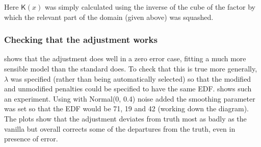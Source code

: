 Here $\mathsf{K}(x)$ was simply calculated using the inverse of the cube of the factor by which the relevant part of the domain (given above) was squashed. 

\subsubsection{Checking that the adjustment works}

 shows that the adjustment does well in a zero error case, fitting a much more sensible model than the standard \tprs does. To check that this is true more generally, $\lambda$ was specified (rather than being automatically selected) so that the modified and unmodified penalties could be specified to have the same EDF.  shows such an experiment. Using  with Normal(0, 0.4) noise added the smoothing parameter was set so that the EDF would be 71, 19 and 42 (working down the diagram). The plots show that the adjustment deviates from truth most as badly as the vanilla \tprs but overall corrects some of the departures from the truth, even in presence of error.

